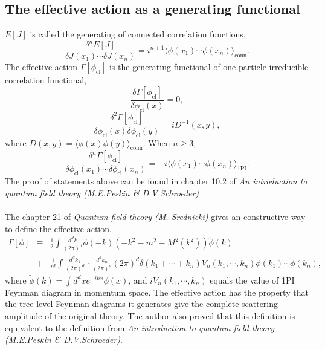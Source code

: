 \subsection{The effective action as a generating functional}
$E[J]$ is called the generating of connected correlation functions,
\[\frac{\delta^n E[J]}{\delta J(x_1) \cdots \delta J(x_n)} = i^{n+1} \langle \phi(x_1) \cdots \phi(x_n) \rangle_{\mbox{conn}}.\]
The effective action $\Gamma[\phi_{\mathrm{cl}}]$ is the generating functional of one-particle-irreducible correlation functional,
\[\frac{\delta \Gamma[\phi_{\mathrm{cl}}]}{\delta \phi_{\mathrm{cl}}(x)}  = 0,\]
\[\frac{\delta^2 \Gamma[\phi_{\mathrm{cl}}]}{\delta \phi_{\mathrm{cl}}(x) \delta \phi_{\mathrm{cl}}(y)}  = iD^{-1}(x,y),\]
where $D(x,y) = \langle \phi(x) \phi(y) \rangle_{\mbox{conn}}$. 
When $n \geq 3$,
\[\frac{\delta^n \Gamma[\phi_{\mathrm{cl}}]}{\delta \phi_{\mathrm{cl}}(x_1) \cdots \delta \phi_{\mathrm{cl}}(x_n)} = -i \langle \phi(x_1) \cdots \phi(x_n) \rangle_{\mbox{1PI}}.\]
The proof of statements above can be found in chapter 10.2 of \emph{An introduction to quantum field theory (M.E.Peskin \& D.V.Schroeder)}
\\ \\
The chapter 21 of \emph{Quantum field theory (M. Srednicki)} gives an constructive way to define the effective action.
\begin{eqnarray}
\Gamma[\phi] & \equiv & \frac{1}{2} \int \frac{d^d k}{(2\pi)^d} \tilde{\phi}(-k)(-k^2 - m^2 - M^2(k^2))\tilde{\phi}(k) \nonumber \\
& + & \frac{1}{n!} \int \frac{d^d k_1}{(2\pi)^d} \cdots \frac{d^d k_n}{(2\pi)^d} (2\pi)^d \delta(k_1+\cdots+k_n) V_n(k_1,\cdots,k_n) \tilde{\phi}(k_1) \cdots \tilde{\phi}(k_n) ,\nonumber
\end{eqnarray}
where $\tilde{\phi}(k) = \int d^dx e^{-ikx} \phi(x)$, and $iV_n(k_1,\cdots,k_n)$ equals the value of 1PI Feynman diagram in momentum space. The effective action has the property that the tree-level Feynman diagrams it generates give the complete scattering amplitude of the original theory. The author also proved that this definition is equivalent to the definition from \emph{An introduction to quantum field theory (M.E.Peskin \& D.V.Schroeder)}.

